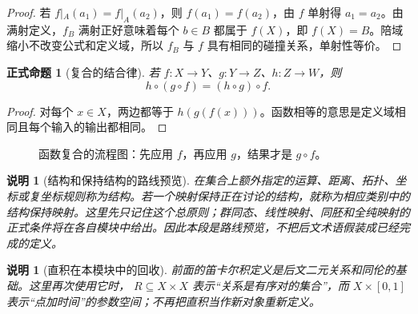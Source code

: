 \documentclass[UTF8,fontset=none,a4paper,11pt]{ctexart}
\theoremstyle{foundation-definition}
\theoremstyle{foundation-theorem}
\theoremstyle{foundation-proposition}
\newtheorem{proposition}[definition]{正式命题}
\theoremstyle{foundation-example}
\theoremstyle{foundation-remark}
\newtheorem{remark}[definition]{说明}
\theoremstyle{foundation-theorem}
\begin{document}
\begin{proof}
若 \(f|_A(a_1)=f|_A(a_2)\)，则 \(f(a_1)=f(a_2)\)，由 \(f\) 单射得
\(a_1=a_2\)。由满射定义，\(f_B\) 满射正好意味着每个 \(b\in B\) 都属于
\(f(X)\)，即 \(f(X)=B\)。陪域缩小不改变公式和定义域，所以 \(f_B\) 与 \(f\)
具有相同的碰撞关系，单射性等价。
\end{proof}

\begin{proposition}[复合的结合律]
若 \(f:X\to Y\)、\(g:Y\to Z\)、\(h:Z\to W\)，则
\[
h\circ(g\circ f)=(h\circ g)\circ f.
\]
\end{proposition}

\begin{proof}
对每个 \(x\in X\)，两边都等于 \(h(g(f(x)))\)。函数相等的意思是定义域相同且每个输入的输出都相同。
\end{proof}

\begin{figure}[htbp]
\centering
{}
\caption{函数复合的流程图：先应用 \(f\)，再应用 \(g\)，结果才是 \(g\circ f\)。}
\label{fig:function-composition-flow}
\end{figure}

\begin{remark}[结构和保持结构的路线预览]\label{rem:structure-map-overview}
在集合上额外指定的运算、距离、拓扑、坐标或复坐标规则称为结构。若一个映射保持正在讨论的结构，就称为相应类别中的结构保持映射。这里先只记住这个总原则；群同态、线性映射、同胚和全纯映射的正式条件将在各自模块中给出。因此本段是路线预览，不把后文术语假装成已经完成的定义。
\end{remark}

\begin{remark}[直积在本模块中的回收]
前面的笛卡尔积定义是后文二元关系和同伦的基础。这里再次使用它时，
\(R\subseteq X\times X\) 表示“关系是有序对的集合”，而
\(X\times[0,1]\) 表示“点加时间”的参数空间；不再把直积当作新对象重新定义。
\end{remark}
\end{document}
